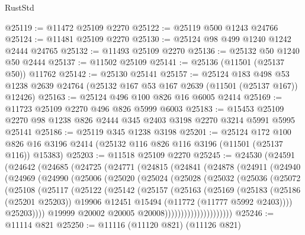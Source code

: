 \begin{lexlean}{RustStd}
\begin{coremodule}
@25119 := @11472 @25109 @2270
@25122 := @25119 @500 @1243 @24766
@25124 := @11481 @25109 @2270
@25130 := @25124 @98 @499 @1240 @1242 @2444 @24765
@25132 := @11493 @25109 @2270
@25136 := @25132 @50 @1240 @50 @2444
@25137 := @11502 @25109
@25141 := @25136 (@11501 (@25137 @50)) @11762
@25142 := @25130 @25141
@25157 := @25124
    @183
    @498
    @53
    @1238
    @2639
    @24764
    (@25132 @167 @53 @167 @2639 (@11501 (@25137 @167)) @12426)
@25163 := @25124 @496 @100 @826 @16 @6005 @2414
@25169 := @11723 @25109 @2270 @496 @826 @5999 @6003
@25183 := @15453 @25109 @2270 @98 @1238 @826 @2444 @345 @2403 @3198 @2270 @3214 @5991 @5995 @25141
@25186 := @25119 @345 @1238 @3198
@25201 := @25124
    @172
    @100
    @826
    @16
    @3196
    @2414
    (@25132 @116 @826 @116 @3196 (@11501 (@25137 @116)) @15383)
@25203 := @11518 @25109 @2270
@25245 := @24530
    (@24591
      (@24642
        (@24685
          (@24725
            (@24771
              (@24815
                (@24841
                  (@24878
                    (@24911
                      (@24940
                        (@24969
                          (@24990
                            (@25006
                              (@25020
                                (@25024
                                  (@25028
                                    (@25032
                                      (@25036
                                        (@25072
                                          (@25108
                                            (@25117
                                              (@25122
                                                (@25142
                                                  (@25157
                                                    (@25163
                                                      (@25169
                                                        (@25183
                                                          (@25186 (@25201 @25203))
                                                          @19906
                                                          @12451
                                                          @15494
                                                          (@11772 (@11777 @5992 @2403))))
                                                      @25203))))
                                              @19999
                                              @20002
                                              @20005
                                              @20008)))))))))))))))))))))
@25246 := @11114 @821
@25250 := @11116 (@11120 @821) (@11126 @821)

\end{coremodule}
\end{lexlean}
